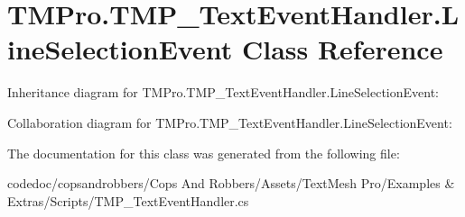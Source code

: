 \hypertarget{classTMPro_1_1TMP__TextEventHandler_1_1LineSelectionEvent}{}\section{T\+M\+Pro.\+T\+M\+P\+\_\+\+Text\+Event\+Handler.\+Line\+Selection\+Event Class Reference}
\label{classTMPro_1_1TMP__TextEventHandler_1_1LineSelectionEvent}


Inheritance diagram for T\+M\+Pro.\+T\+M\+P\+\_\+\+Text\+Event\+Handler.\+Line\+Selection\+Event\+:


Collaboration diagram for T\+M\+Pro.\+T\+M\+P\+\_\+\+Text\+Event\+Handler.\+Line\+Selection\+Event\+:


The documentation for this class was generated from the following file\+:\begin{DoxyCompactItemize}
\item 
codedoc/copsandrobbers/\+Cops And Robbers/\+Assets/\+Text\+Mesh Pro/\+Examples \& Extras/\+Scripts/T\+M\+P\+\_\+\+Text\+Event\+Handler.\+cs\end{DoxyCompactItemize}

